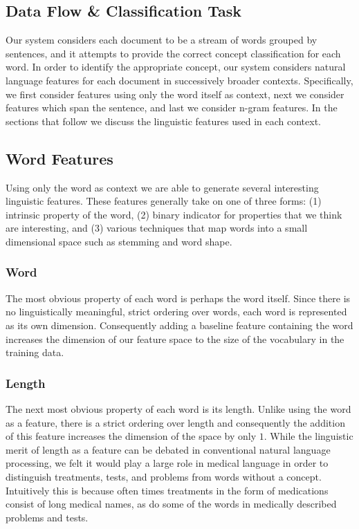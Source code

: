 \documentclass[preprint]{style}
\begin{document}
\subsection{Data Flow \& Classification Task}
Our system considers each document to be a stream of words grouped by sentences, and it attempts to provide the correct concept classification for each word. In order to identify the appropriate concept, our system considers natural language features for each document in successively broader contexts. Specifically, we first consider features using only the word itself as context, next we consider features which span the sentence, and last we consider n-gram features. In the sections that follow we discuss the linguistic features used in each context.

\subsection{Word Features}
Using only the word as context we are able to generate several interesting linguistic features. These features generally take on one of three forms: (1) intrinsic property of the word, (2) binary indicator for properties that we think are interesting, and (3) various techniques that map words into a small dimensional space such as stemming and word shape.

\subsubsection{Word}
The most obvious property of each word is perhaps the word itself. Since there is no linguistically meaningful, strict ordering over words, each word is represented as its own dimension. Consequently adding a baseline feature containing the word increases the dimension of our feature space to the size of the vocabulary in the training data.

\subsubsection{Length}
The next most obvious property of each word is its length. Unlike using the word as a feature, there is a strict ordering over length and consequently the addition of this feature increases the dimension of the space by only $1$. While the linguistic merit of length as a feature can be debated in conventional natural language processing, we felt it would play a large role in medical language in order to distinguish treatments, tests, and problems from words without a concept. Intuitively this is because often times treatments in the form of medications consist of long medical names, as do some of the words in medically described problems and tests.
\end{document}
